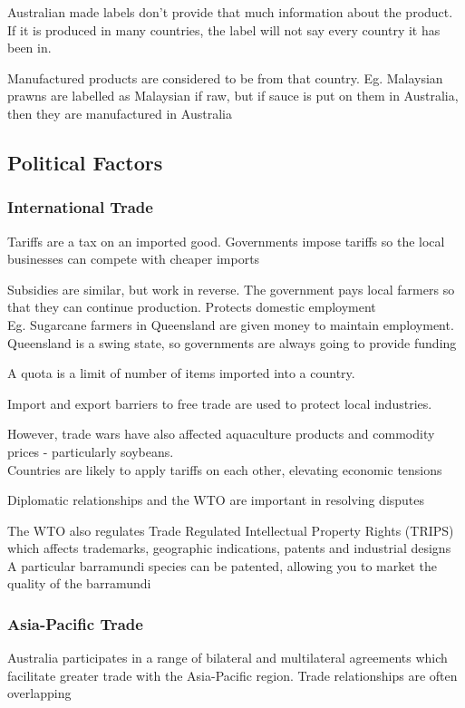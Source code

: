 				Australian made labels don't provide that much information about the product. If it is produced in many countries, the label will not say every country it has been in.

				Manufactured products are considered to be from that country. Eg. Malaysian prawns are labelled as Malaysian if raw, but if sauce is put on them in Australia, then they are manufactured in Australia

		\subsection{Political Factors}
			\subsubsection{International Trade}
				Tariffs are a tax on an imported good. Governments impose tariffs so the local businesses can compete with cheaper imports

				Subsidies are similar, but work in reverse. The government pays local farmers so that they can continue production. Protects domestic employment \\
					\; Eg. Sugarcane farmers in Queensland are given money to maintain employment. Queensland is a swing state, so governments are always going to provide funding
				
				A quota is a limit of number of items imported into a country.

				Import and export barriers to free trade are used to protect local industries.

				However, trade wars have also affected aquaculture products and commodity prices - particularly soybeans. \\
					\; Countries are likely to apply tariffs on each other, elevating economic tensions

				Diplomatic relationships and the WTO are important in resolving disputes

				The WTO also regulates Trade Regulated Intellectual Property Rights (TRIPS) which affects trademarks, geographic indications, patents and industrial designs \\
				\; A particular barramundi species can be patented, allowing you to market the quality of the barramundi

			\subsubsection{Asia-Pacific Trade}
				Australia participates in a range of bilateral and multilateral agreements which facilitate greater trade with the Asia-Pacific region.
				Trade relationships are often overlapping


